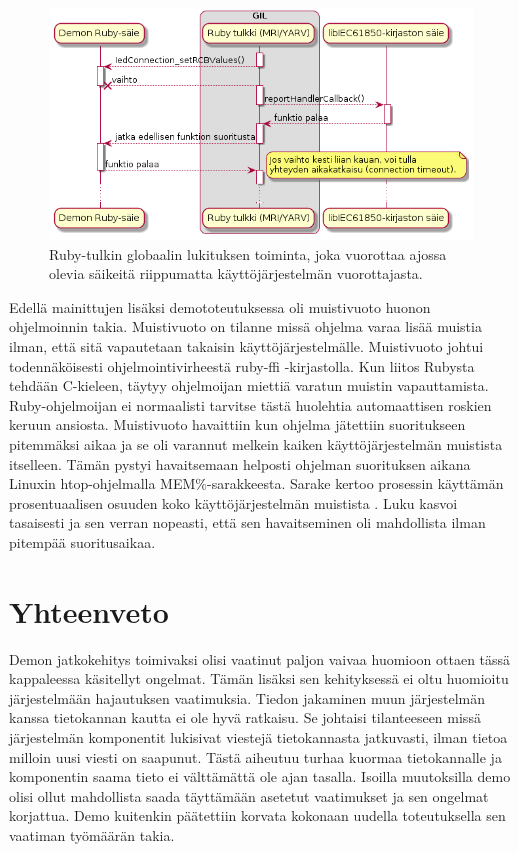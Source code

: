 \begin{figure}[ht!]
	\includegraphics[width=1\textwidth]{pictures/ruby-gil.png}
	\caption{Ruby-tulkin globaalin lukituksen toiminta, joka vuorottaa ajossa olevia säikeitä riippumatta käyttöjärjestelmän vuorottajasta.}
	\label{fig:ruby-gil}
\end{figure}

Edellä mainittujen lisäksi demototeutuksessa oli muistivuoto huonon ohjelmoinnin takia. Muistivuoto on tilanne missä ohjelma varaa lisää muistia ilman, että sitä vapautetaan takaisin käyttöjärjestelmälle. Muistivuoto johtui todennäköisesti ohjelmointivirheestä ruby-ffi -kirjastolla. Kun liitos Rubysta tehdään C-kieleen, täytyy ohjelmoijan miettiä varatun muistin vapauttamista. Ruby-ohjelmoijan ei normaalisti tarvitse tästä huolehtia automaattisen roskien keruun ansiosta. Muistivuoto havaittiin kun ohjelma jätettiin suoritukseen pitemmäksi aikaa ja se oli varannut melkein kaiken käyttöjärjestelmän muistista itselleen. Tämän pystyi havaitsemaan helposti ohjelman suorituksen aikana Linuxin htop-ohjelmalla MEM\%-sarakkeesta. Sarake kertoo prosessin käyttämän prosentuaalisen osuuden koko käyttöjärjestelmän muistista \cite{htop-user-guide}. Luku kasvoi tasaisesti ja sen verran nopeasti, että sen havaitseminen oli mahdollista ilman pitempää suoritusaikaa.


\section{Yhteenveto}
Demon jatkokehitys toimivaksi olisi vaatinut paljon vaivaa huomioon ottaen tässä kappaleessa käsitellyt ongelmat. Tämän lisäksi sen kehityksessä ei oltu huomioitu järjestelmään hajautuksen vaatimuksia. Tiedon jakaminen muun järjestelmän kanssa tietokannan kautta ei ole hyvä ratkaisu. Se johtaisi tilanteeseen missä järjestelmän komponentit lukisivat viestejä tietokannasta jatkuvasti, ilman tietoa milloin uusi viesti on saapunut. Tästä aiheutuu turhaa kuormaa tietokannalle ja komponentin saama tieto ei välttämättä ole ajan tasalla. Isoilla muutoksilla demo olisi ollut mahdollista saada täyttämään asetetut vaatimukset ja sen ongelmat korjattua. Demo kuitenkin päätettiin korvata kokonaan uudella toteutuksella sen vaatiman työmäärän takia.

